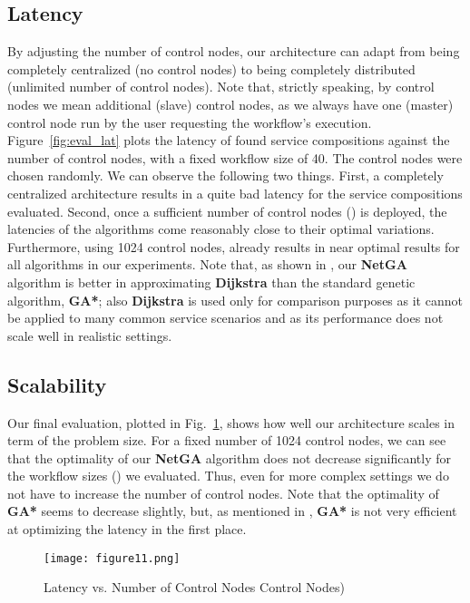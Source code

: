 \documentclass[10pt, conference, compsocconf]{IEEEtran}
\newcommand{\oneImage}{3.2in}
\begin{document}
\subsection{Latency}
\noindent By adjusting the number of control nodes,
	our architecture can adapt from being completely centralized (no control nodes)
		to being completely distributed (unlimited number of control nodes).
Note that, strictly speaking, by control nodes we mean additional (slave) control nodes,
	as we always have one (master) control node run by the user requesting the workflow's execution.
Figure~\ref{fig:eval_lat} plots the latency of found service compositions against the number of control nodes,
	with a fixed workflow size of 40.
The control nodes were chosen randomly.
We can observe the following two things.
First, a completely centralized architecture results in a quite bad latency for the service compositions evaluated.
Second, once a sufficient number of control nodes () is deployed,
	the latencies of the algorithms come reasonably close to their optimal variations.
Furthermore,
	using 1024 control nodes, already results in near optimal results for all algorithms in our experiments.
Note that, as shown in \cite{Klein2012}, our \textbf{NetGA} algorithm is better in approximating \textbf{Dijkstra} than the standard genetic algorithm, \textbf{GA*};
	also \textbf{Dijkstra} is used only for comparison purposes as it cannot be applied to many common service scenarios
		and as its performance does not scale well in realistic settings.
    
\subsection{Scalability}
\noindent Our final evaluation, plotted in Fig.~\ref{fig:eval_wf}, shows how well our architecture scales in term of the problem size.
For a fixed number of 1024 control nodes,
	we can see that the optimality of our \textbf{NetGA} algorithm does not decrease significantly for the workflow sizes () we evaluated.
Thus, even for more complex settings we do not have to increase the number of control nodes.
Note that the optimality of \textbf{GA*} seems to decrease slightly,
	but, as mentioned in \cite{Klein2012}, \textbf{GA*} is not very efficient at optimizing the latency in the first place.

\begin{figure}[t]
	\centering
	\texttt{[image: figure11.png]}
	\caption{Latency vs. Number of Control Nodes Control Nodes)}
	\label{fig:eval_wf}
\end{figure}



\end{document}
